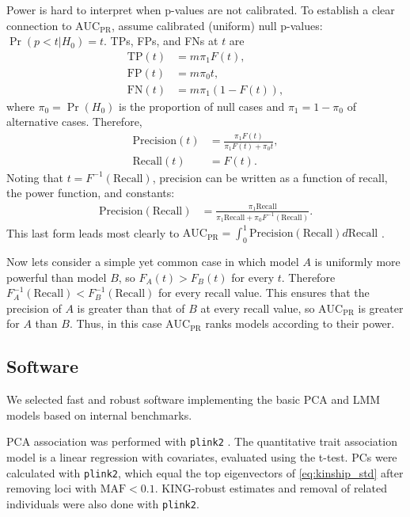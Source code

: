 \documentclass[11pt]{article}
\newcommand{\auc}{\text{AUC}_\text{PR}}
\begin{document}
Power is hard to interpret when p-values are not calibrated.
To establish a clear connection to $\auc$, assume calibrated (uniform) null p-values: $\Pr( p < t | H_0 ) = t$.
TPs, FPs, and FNs at $t$ are
\begin{align*}
  \text{TP}(t)
  &=
    m \pi_1 F(t)
    , \\
  \text{FP}(t)
  &=
    m \pi_0 t
    , \\
  \text{FN}(t)
  &=
    m \pi_1 ( 1 - F(t) )
    ,
\end{align*}
where $\pi_0 = \Pr( H_0 )$ is the proportion of null cases and $\pi_1 = 1 - \pi_0$ of alternative cases.
Therefore, 
\begin{align*}
  \text{Precision}(t)
  &=
    \frac{ \pi_1 F(t) }{ \pi_1 F(t) + \pi_0 t }
    , \\
  \text{Recall}(t)
  &=
    F(t)
    .
\end{align*}
Noting that $t = F^{-1}( \text{Recall} )$, precision can be written as a function of recall, the power function, and constants:
\begin{align*}
  \text{Precision}( \text{Recall} )
  &=
    \frac{ \pi_1 \text{Recall} }{ \pi_1 \text{Recall} + \pi_0 F^{-1}( \text{Recall} ) }
    .
\end{align*}
This last form leads most clearly to
$
\auc
=
\int_0^1 \text{Precision}( \text{Recall} ) d \text{Recall}
$
.

Now lets consider a simple yet common case in which model $A$ is uniformly more powerful than model $B$, so $F_A(t) > F_B(t)$ for every $t$.
Therefore $F_A^{-1}( \text{Recall} ) < F_B^{-1}( \text{Recall} )$ for every recall value.
This ensures that the precision of $A$ is greater than that of $B$ at every recall value, so $\auc$ is greater for $A$ than $B$.
Thus, in this case $\auc$ ranks models according to their power.

\subsection{Software}

We selected fast and robust software implementing the basic PCA and LMM models based on internal benchmarks.

PCA association was performed with \texttt{plink2} \citep{chang_second-generation_2015}.
The quantitative trait association model is a linear regression with covariates, evaluated using the t-test.
PCs were calculated with \texttt{plink2}, which equal the top eigenvectors of \cref{eq:kinship_std} after removing loci with $\text{MAF} < 0.1$.
KING-robust estimates and removal of related individuals were also done with \texttt{plink2}.
\end{document}
